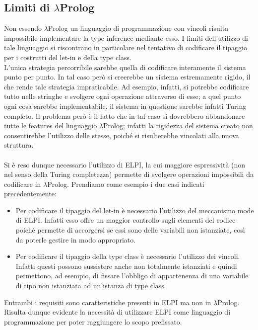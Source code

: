 \documentclass[12pt,a4paper,openright,twoside]{report}
\begin{document}
\subsection{Limiti di $\lambda$Prolog}\label{limLamProl}
Non essendo $\lambda$Prolog un linguaggio di programmazione con vincoli risulta impossibile implementare la type inference mediante esso. I limiti dell'utilizzo di tale linguaggio si riscontrano in particolare nel tentativo di codificare il tipaggio per i costrutti del let-in e della type class.\\
L'unica strategia percorribile sarebbe quella di codificare interamente il sistema punto per punto. In tal caso però si creerebbe un sistema estremamente rigido, il che rende tale strategia impraticabile. Ad esempio, infatti, si potrebbe codificare tutto nelle stringhe e svolgere ogni operazione attraverso di esse; a quel punto ogni cosa sarebbe implementabile, il sistema in questione sarebbe infatti Turing completo. Il problema però è il fatto che in tal caso si dovrebbero abbandonare tutte le features del linguaggio $\lambda$Prolog; infatti la rigidezza del sistema creato non consentirebbe l'utilizzo delle stesse, poiché si risulterebbe vincolati alla nuova struttura.

\paragraph{}
Si è reso dunque necessario l'utilizzo di ELPI, la cui maggiore espressività (non nel senso della Turing completezza) permette di svolgere operazioni impossibili da codificare in $\lambda$Prolog. Prendiamo come esempio i due casi indicati precedentemente:
\begin{itemize}
 \item Per codificare il tipaggio del let-in è necessario l'utilizzo del meccanismo mode di ELPI. Infatti esso offre un maggior controllo sugli elementi del codice poiché permette di accorgersi se essi sono delle variabili non istanziate, così da poterle gestire in modo appropriato.
 \item Per codificare il tipaggio della type class è necessario l'utilizzo dei vincoli. Infatti questi possono sussistere anche non totalmente istanziati e quindi permettono, ad esempio, di fissare l'obbligo di appartenenza di una variabile di tipo non istanziata ad un'istanza di type class.
\end{itemize}
Entrambi i requisiti sono caratteristiche presenti in ELPI ma non in $\lambda$Prolog. Risulta dunque evidente la necessità di utilizzare ELPI come linguaggio di programmazione per poter raggiungere lo scopo prefissato.
\end{document}
